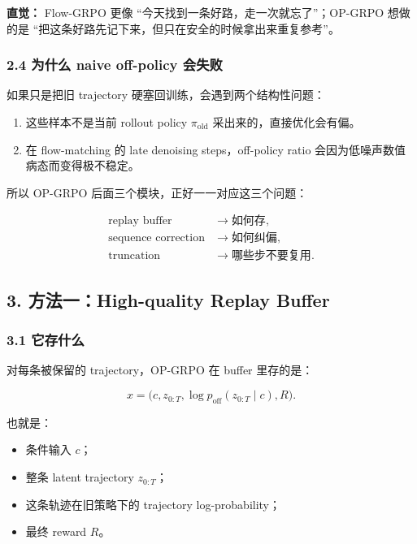 \begin{intubox}
\textbf{直觉：} Flow-GRPO 更像 ``今天找到一条好路，走一次就忘了''；OP-GRPO 想做的是 ``把这条好路先记下来，但只在安全的时候拿出来重复参考''。
\end{intubox}

\subsubsection{2.4 为什么 naive off-policy 会失败}

如果只是把旧 trajectory 硬塞回训练，会遇到两个结构性问题：

\begin{enumerate}[leftmargin=1.5em]
  \item 这些样本不是当前 rollout policy \(\pi_{\mathrm{old}}\) 采出来的，直接优化会有偏。
  \item 在 flow-matching 的 late denoising steps，off-policy ratio 会因为低噪声数值病态而变得极不稳定。
\end{enumerate}

所以 OP-GRPO 后面三个模块，正好一一对应这三个问题：

\[
\begin{aligned}
\text{replay buffer} &\rightarrow \text{如何存},\\
\text{sequence correction} &\rightarrow \text{如何纠偏},\\
\text{truncation} &\rightarrow \text{哪些步不要复用}.
\end{aligned}
\]

\subsection{3. 方法一：High-quality Replay Buffer}

\subsubsection{3.1 它存什么}

对每条被保留的 trajectory，OP-GRPO 在 buffer 里存的是：

\[
x = \big(c, z_{0:T}, \log p_{\mathrm{off}}(z_{0:T}\mid c), R\big).
\]

也就是：

\begin{itemize}[leftmargin=1.5em]
  \item 条件输入 \(c\)；
  \item 整条 latent trajectory \(z_{0:T}\)；
  \item 这条轨迹在旧策略下的 trajectory log-probability；
  \item 最终 reward \(R\)。
\end{itemize}

